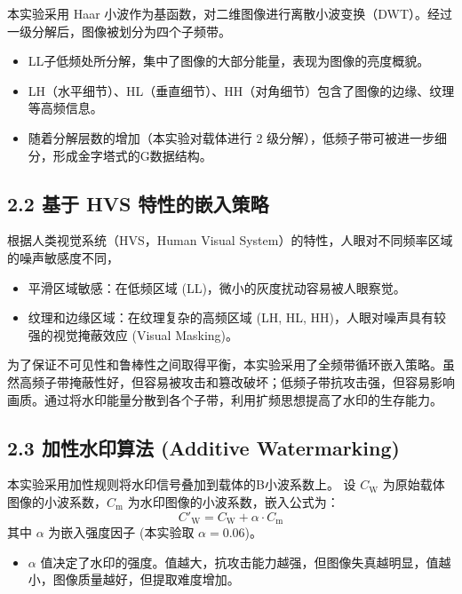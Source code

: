 \documentclass[12pt, a4paper]{article}
\begin{document}
本实验采用 Haar 小波作为基函数，对二维图像进行离散小波变换（DWT）。经过一级分解后，图像被划分为四个子频带。
\begin{itemize}
    \item LL子低频处所分解，集中了图像的大部分能量，表现为图像的亮度概貌。
    \item LH（水平细节）、HL（垂直细节）、HH（对角细节）包含了图像的边缘、纹理等高频信息。
    \item 随着分解层数的增加（本实验对载体进行 2 级分解），低频子带可被进一步细分，形成金字塔式的G数据结构。
\end{itemize}

\subsection*{2.2 基于 HVS 特性的嵌入策略}
根据人类视觉系统（HVS，Human Visual System）的特性，人眼对不同频率区域的噪声敏感度不同，
\begin{itemize}
    \item 平滑区域敏感：在低频区域 (LL)，微小的灰度扰动容易被人眼察觉。
    \item 纹理和边缘区域：在纹理复杂的高频区域 (LH, HL, HH)，人眼对噪声具有较强的视觉掩蔽效应 (Visual Masking)。
\end{itemize}
为了保证不可见性和鲁棒性之间取得平衡，本实验采用了全频带循环嵌入策略。虽然高频子带掩蔽性好，但容易被攻击和篡改破坏；低频子带抗攻击强，但容易影响画质。通过将水印能量分散到各个子带，利用扩频思想提高了水印的生存能力。

\subsection*{2.3 加性水印算法 (Additive Watermarking)}
本实验采用加性规则将水印信号叠加到载体的B小波系数上。
设 $C_{\text{W}}$ 为原始载体图像的小波系数，$C_{\text{m}}$ 为水印图像的小波系数，嵌入公式为：
\begin{equation}
    C'_{\text{W}} = C_{\text{W}} + \alpha \cdot C_{\text{m}}
\end{equation}
其中 $\alpha$ 为嵌入强度因子 (本实验取 $\alpha=0.06$)。
\begin{itemize}
    \item $\alpha$ 值决定了水印的强度。值越大，抗攻击能力越强，但图像失真越明显，值越小，图像质量越好，但提取难度增加。
\end{itemize}
\end{document}
